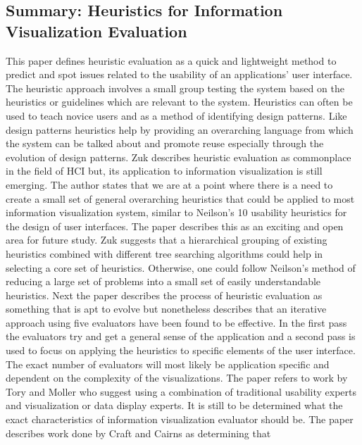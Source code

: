 \documentclass{sig-alternate}
\begin{document}
\subsection{Summary: Heuristics for Information Visualization Evaluation
\cite{Zuk:2006:HeuristicsForInformationVisualizationEvaluation}} This paper
defines heuristic evaluation as a quick and lightweight method to predict and
spot issues related to the usability of an applications' user interface. The
heuristic approach involves a small  group testing the system based on the
heuristics or guidelines which are relevant to the system. Heuristics can often
be used to teach novice users and as a method of identifying design patterns.
Like design patterns heuristics help by providing an overarching language from
which the system can be talked about and promote reuse especially through the
evolution of design patterns. Zuk describes heuristic evaluation as commonplace
in the field of HCI but, its application to information visualization is still
emerging.  The author states that we are at a point where there is a need to
create a small set of general  overarching heuristics that could be applied to
most information visualization system, similar to Neilson's 10 usability
heuristics for the design of user interfaces. The paper describes this as an
exciting and open area for future study. Zuk suggests  that a hierarchical
grouping of existing heuristics combined with different tree searching
algorithms could help in selecting a core set of heuristics. Otherwise,  one
could follow Neilson's method of reducing a large set of problems into a small
set of easily understandable heuristics. Next the paper describes the process of
heuristic evaluation as something that is apt to evolve but nonetheless
describes that an iterative approach using five evaluators have been found to be
effective. In the first pass the evaluators try and get a general sense of the
application and a second pass is used to focus on applying the heuristics to 
specific elements of the user interface. The exact number of evaluators will
most likely be application specific and dependent on the complexity of the
visualizations. The paper refers to work by Tory and Moller 
\cite{Tory:2005:EvaluatingVisualizations} who suggest using a combination of
traditional usability experts and visualization or data display experts. It is
still to be determined what the exact characteristics of  information
visualization evaluator should be.  The paper describes work done by Craft and
Cairns \cite{Craft:2005:VisualInformationSeekingMantra} as determining that
\end{document}
